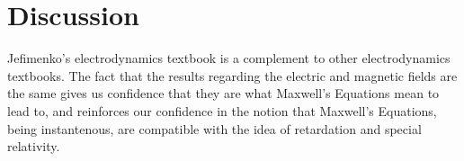 \documentclass[11pt]{article}              %
\begin{document}







\section{Discussion}
Jefimenko's electrodynamics textbook is a complement to other electrodynamics textbooks. The fact that the results regarding the electric and magnetic fields are the same gives us confidence that they are what Maxwell's Equations mean to lead to, and reinforces our confidence in the notion that Maxwell's Equations, being instantenous, are compatible with the idea of retardation and special relativity.
\end{document}
